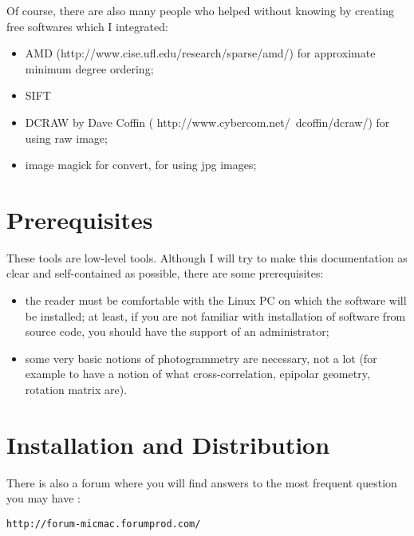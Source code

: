 Of course, there are also many people who helped without knowing by creating
free softwares which I integrated:


\begin{itemize}
   \item    AMD  (http://www.cise.ufl.edu/research/sparse/amd/) for approximate minimum degree ordering;
   \item    SIFT
   \item    DCRAW by Dave Coffin ( http://www.cybercom.net/~dcoffin/dcraw/) for using raw image;
   \item    image magick for convert, for using jpg images;
\end{itemize}


\section{Prerequisites}

These tools are low-level tools. Although I will try to make this
documentation as clear and self-contained as possible, there are some
prerequisites:

\begin{itemize}
   \item the reader must be comfortable with the Linux PC on which the software
         will be installed; at least, if you are not familiar with installation
         of software from source code, you should have the support of
         an administrator;

   \item some very basic notions of photogrammetry are necessary, not a lot
         (for example to have a notion of what cross-correlation,
         epipolar geometry, rotation matrix are).
\end{itemize}


\section{Installation and Distribution}

There is also a forum where you will find answers to the most frequent question
you may have :

\begin{verbatim}
http://forum-micmac.forumprod.com/
\end{verbatim}



